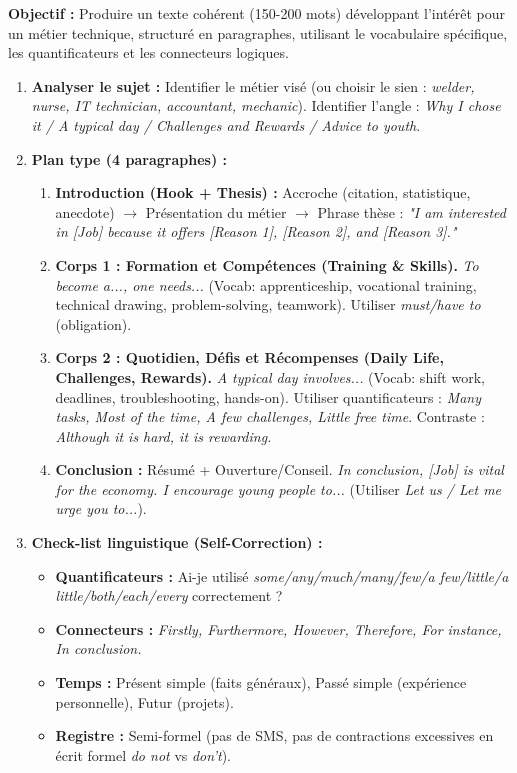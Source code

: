 \documentclass[11pt]{article}
\newcommand{\cle}[1]{{\popxbold\color{popdark}#1}}
\begin{document}
\begin{methode}
    \textbf{Objectif :} Produire un texte cohérent (150-200 mots) développant l'intérêt pour un métier technique, structuré en paragraphes, utilisant le vocabulaire spécifique, les quantificateurs et les connecteurs logiques.
    \begin{enumerate}
        \item \textbf{Analyser le sujet :} Identifier le métier visé (ou choisir le sien : \emph{welder, nurse, IT technician, accountant, mechanic}). Identifier l'angle : \emph{Why I chose it / A typical day / Challenges and Rewards / Advice to youth}.
        \item \textbf{Plan type (4 paragraphes) :}
              \begin{enumerate}
                  \item \textbf{Introduction (Hook + Thesis) :} Accroche (citation, statistique, anecdote) $\rightarrow$ Présentation du métier $\rightarrow$ Phrase thèse : \emph{"I am interested in [Job] because it offers [Reason 1], [Reason 2], and [Reason 3]."}
                  \item \textbf{Corps 1 : Formation et Compétences (Training \& Skills).} \emph{To become a..., one needs...} (Vocab: \cle{apprenticeship}, \cle{vocational training}, \cle{technical drawing}, \cle{problem-solving}, \cle{teamwork}). Utiliser \emph{must/have to} (obligation).
                  \item \textbf{Corps 2 : Quotidien, Défis et Récompenses (Daily Life, Challenges, Rewards).} \emph{A typical day involves...} (Vocab: \cle{shift work}, \cle{deadlines}, \cle{troubleshooting}, \cle{hands-on}). Utiliser quantificateurs : \emph{Many tasks, Most of the time, A few challenges, Little free time}. Contraste : \emph{Although it is hard, it is rewarding.}
                  \item \textbf{Conclusion :} Résumé + Ouverture/Conseil. \emph{In conclusion, [Job] is vital for the economy. I encourage young people to...} (Utiliser \emph{Let us / Let me urge you to...}).
              \end{enumerate}
        \item \textbf{Check-list linguistique (Self-Correction) :}
              \begin{itemize}
                  \item \textbf{Quantificateurs :} Ai-je utilisé \emph{some/any/much/many/few/a few/little/a little/both/each/every} correctement ?
                  \item \textbf{Connecteurs :} \emph{Firstly, Furthermore, However, Therefore, For instance, In conclusion.}
                  \item \textbf{Temps :} Présent simple (faits généraux), Passé simple (expérience personnelle), Futur (projets).
                  \item \textbf{Registre :} Semi-formel (pas de SMS, pas de contractions excessives en écrit formel \emph{do not} vs \emph{don't}).
              \end{itemize}
    \end{enumerate}
\end{methode}
\end{document}
